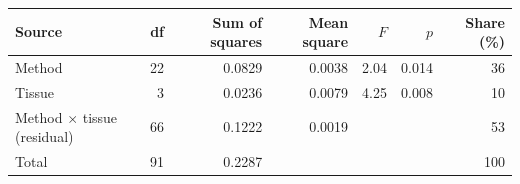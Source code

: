 
\begin{tabular}{lrrrrrr}
\toprule
Source & df & Sum of squares & Mean square & $F$ & $p$ & Share (\%)\\
\midrule
Method & 22 & 0.0829 & 0.0038 & 2.04 & 0.014 & 36\\
Tissue & 3 & 0.0236 & 0.0079 & 4.25 & 0.008 & 10\\
Method $\times$ tissue (residual) & 66 & 0.1222 & 0.0019 &  &  & 53\\
Total & 91 & 0.2287 &  &  &  & 100\\
\bottomrule
\end{tabular}
